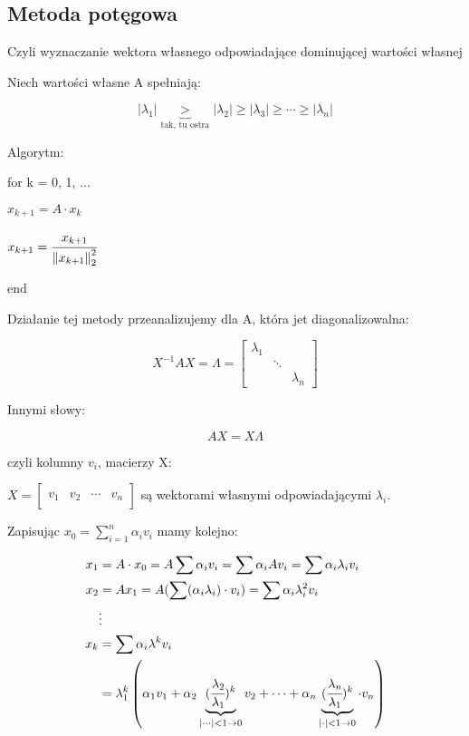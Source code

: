 \documentclass[hidelinks,a4paper,fleqn]{article}
\newcommand{\ra}{\rightarrow}
\newcommand{\norm}[1]{\left\lVert#1\right\rVert}
\begin{document}
\subsection{Metoda potęgowa}
Czyli wyznaczanie wektora własnego odpowiadające dominującej wartości własnej

Niech wartości własne A spełniają:

\[
	|\lambda_1| \underbrace{>}_{\textrm{tak, tu ostra}} |\lambda_2| \geq |\lambda_3| \geq \cdots \geq |\lambda_n|
\]

Algorytm:

for k = 0, 1, ...
 
$x_{k+1} = A \cdot x_k$

$x_{k+1} = \cfrac{x_{k+1}}{\norm{x_{k+1}}_2^2}$

end
 
Działanie tej metody przeanalizujemy dla A, która jet diagonalizowalna:
 
\[
	X^{-1} A X = \Lambda = \begin{bmatrix} \lambda_1 &  & \\  &  \ddots & \\ &  & \lambda_n \end{bmatrix}
\]
 
Innymi słowy:
 
\[
	AX = X \Lambda
\]
 
czyli kolumny $v_i$, macierzy X:
 
$X = \left[ \begin{array}{c|c|c|c} &&& \\ v_1 & v_2 & \cdots & v_n \\ &&& \end{array} \right]$ są wektorami własnymi odpowiadającymi $\lambda_i$.
 
Zapisując $x_0 = \sum_{i=1}^{n} \alpha_i v_i$ mamy kolejno:
 
\begin{align*}
	x_1 & = A \cdot x_0 = A \sum \alpha_iv_i = \sum \alpha_i Av_i = \sum \alpha_i \lambda_i v_i \\
	x_2 & = Ax_1 = A(\sum(\alpha_i\lambda_i)\cdot v_i) = \sum \alpha_i \lambda_i^2 v_i \\
	& \vdots \\
	x_k & = \sum \alpha_i \lambda^k v_i \\ & = \lambda_1^k\left(\alpha_1 v_1 + \alpha_2\underbrace{(\cfrac{\lambda_2}{\lambda_1})^k}_{| \cdots | < 1 \ra 0} v_2 + \cdots + \alpha_n \underbrace{(\cfrac{\lambda_n}{\lambda_1})^k}_{| \cdot | < 1 \ra 0} \cdot v_n\right)
\end{align*}
 
\end{document}
